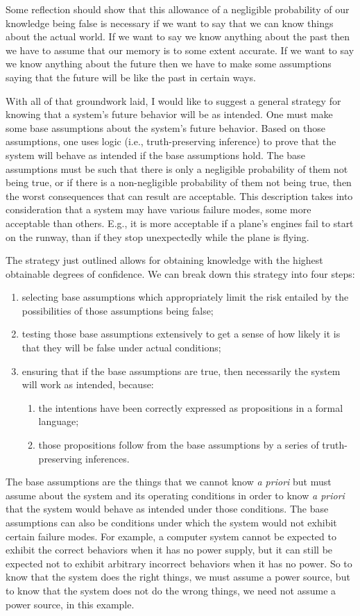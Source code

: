 \documentclass[11pt]{article}
\begin{document}
Some reflection should show that this allowance of a negligible probability
of our knowledge being false is necessary if we want to say that we can know things
about the actual world. If we want to say we know anything about the past then we have
to assume that our memory is to some extent accurate. If we want to say we know anything
about the future then we have to make some assumptions saying that the future will
be like the past in certain ways.

With all of that groundwork laid, I would like to suggest a general strategy for
knowing that a system's future behavior will be as intended. One must make some base
assumptions about the system's future behavior. Based on those assumptions, one uses
logic (i.e., truth-preserving inference) to prove that the system will behave as intended
if the base assumptions hold. The base assumptions must be such that there is only a
negligible probability of them not being true, or if there is a non-negligible probability
of them not being true, then the worst consequences that can result are acceptable.
This description takes into consideration that a system may have various failure modes,
some more acceptable than others. E.g., it is more acceptable if a plane's engines fail
to start on the runway, than if they stop unexpectedly while the plane is flying.

The strategy just outlined allows for obtaining knowledge with the highest obtainable
degrees of confidence. We can break down this strategy into four steps:
\begin{enumerate}
	\item selecting base assumptions which appropriately limit the risk entailed
		by the possibilities of those assumptions being false;
	\item testing those base assumptions extensively to get a sense of how
		likely it is that they will be false under actual conditions;
	\item ensuring that if the base assumptions are true, then necessarily the
		system will work as intended, because:
		\begin{enumerate}
			\item the intentions have been correctly expressed as propositions in a formal language;
			\item those propositions follow from the base assumptions by a series of truth-preserving inferences.
		\end{enumerate}
\end{enumerate}
The base assumptions are the things that we cannot know \emph{a priori}\/ but must
assume about the system and its operating conditions in order to know \emph{a priori}\/ that
the system would behave as intended under those conditions. The base assumptions can
also be conditions under which the system would not exhibit certain failure modes.
For example, a computer system cannot be expected to exhibit the correct behaviors when it has
no power supply, but it can still be expected not to exhibit arbitrary incorrect behaviors
when it has no power. So to know that the system does the right things, we must assume
a power source, but to know that the system does not do the wrong things, we need not assume
a power source, in this example.
\end{document}
